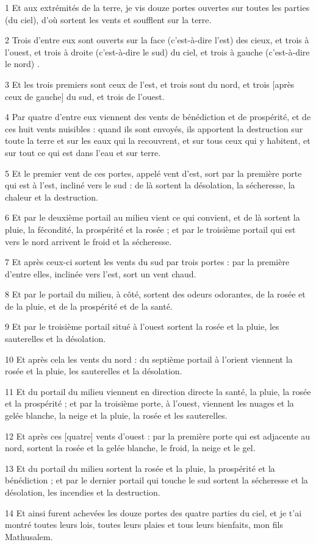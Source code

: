 \par 1 Et aux extrémités de la terre, je vis douze portes ouvertes sur toutes les parties (du ciel), d'où sortent les vents et soufflent sur la terre.
\par 2 Trois d'entre eux sont ouverts sur la face (c'est-à-dire l'est) des cieux, et trois à l'ouest, et trois à droite (c'est-à-dire le sud) du ciel, et trois à gauche (c'est-à-dire le nord) .
\par 3 Et les trois premiers sont ceux de l'est, et trois sont du nord, et trois [après ceux de gauche] du sud, et trois de l'ouest.
\par 4 Par quatre d'entre eux viennent des vents de bénédiction et de prospérité, et de ces huit vents nuisibles : quand ils sont envoyés, ils apportent la destruction sur toute la terre et sur les eaux qui la recouvrent, et sur tous ceux qui y habitent, et sur tout ce qui est dans l'eau et sur terre.
\par 5 Et le premier vent de ces portes, appelé vent d'est, sort par la première porte qui est à l'est, incliné vers le sud : de là sortent la désolation, la sécheresse, la chaleur et la destruction.
\par 6 Et par le deuxième portail au milieu vient ce qui convient, et de là sortent la pluie, la fécondité, la prospérité et la rosée ; et par le troisième portail qui est vers le nord arrivent le froid et la sécheresse.
\par 7 Et après ceux-ci sortent les vents du sud par trois portes : par la première d'entre elles, inclinée vers l'est, sort un vent chaud.
\par 8 Et par le portail du milieu, à côté, sortent des odeurs odorantes, de la rosée et de la pluie, et de la prospérité et de la santé.
\par 9 Et par le troisième portail situé à l'ouest sortent la rosée et la pluie, les sauterelles et la désolation.
\par 10 Et après cela les vents du nord : du septième portail à l'orient viennent la rosée et la pluie, les sauterelles et la désolation.
\par 11 Et du portail du milieu viennent en direction directe la santé, la pluie, la rosée et la prospérité ; et par la troisième porte, à l'ouest, viennent les nuages ​​et la gelée blanche, la neige et la pluie, la rosée et les sauterelles.
\par 12 Et après ces [quatre] vents d'ouest : par la première porte qui est adjacente au nord, sortent la rosée et la gelée blanche, le froid, la neige et le gel.
\par 13 Et du portail du milieu sortent la rosée et la pluie, la prospérité et la bénédiction ; et par le dernier portail qui touche le sud sortent la sécheresse et la désolation, les incendies et la destruction.
\par 14 Et ainsi furent achevées les douze portes des quatre parties du ciel, et je t'ai montré toutes leurs lois, toutes leurs plaies et tous leurs bienfaits, mon fils Mathusalem.

